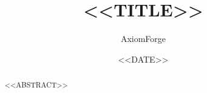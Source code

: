 \documentclass[11pt]{amsart}
\title[<<SHORT TITLE>>]{<<TITLE>>}
\author{AxiomForge}
\date{<<DATE>>}
\begin{document}
\begin{abstract}
<<ABSTRACT>>
\end{abstract}

\affrontmatter


% 

% 

\clearpage



\clearpage


\end{document}

